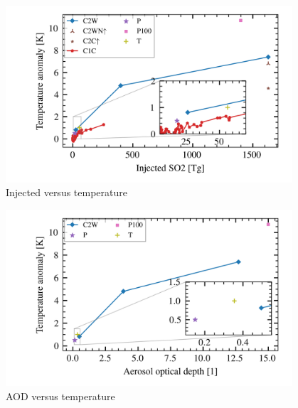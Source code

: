 \documentclass{ametsocV5}
\begin{document}
\begin{figure}
	\begin{center}
		\includegraphics[width=0.95\textwidth]{figures/injection_vs_temperature.png}
	\end{center}
	\caption{Injected  versus temperature}
	\label{fig:so2_vs_temp}
\end{figure}

\begin{figure}
	\begin{center}
		\includegraphics[width=0.95\textwidth]{figures/aod_vs_temperature.png}
	\end{center}
	\caption{AOD versus temperature}
	\label{fig:aod_vs_temp}
\end{figure}
\end{document}
